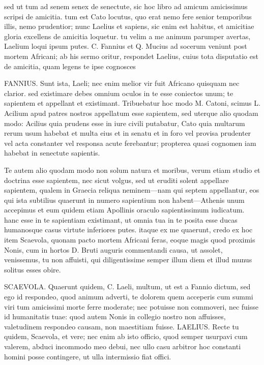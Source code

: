  sed ut tum ad senem senex de senectute, sic hoc libro ad amicum amicissimus scripsi de amicitia. tum est Cato locutus, quo erat nemo fere senior temporibus illis, nemo prudentior; nunc Laelius et sapiens, sic enim est habitus, et amicitiae gloria excellens de amicitia loquetur. tu velim a me animum parumper avertas, Laelium loqui ipsum putes. C. Fannius et Q. Mucius ad socerum veniunt post mortem Africani; ab his sermo oritur, respondet Laelius, cuius tota disputatio est de amicitia, quam legens te ipse cognosces

 FANNIUS. Sunt ista, Laeli; nec enim melior vir fuit Africano quisquam nec clarior. sed existimare debes omnium oculos in te esse coniectos unum; te sapientem et appellant et existimant. Tribuebatur hoc modo M. Catoni, scimus L. Acilium apud patres nostros appellatum esse sapientem, sed uterque alio quodam modo: Acilius quia prudens esse in iure civili putabatur, Cato quia multarum rerum usum habebat et multa eius et in senatu et in foro vel provisa prudenter vel acta constanter vel responsa acute ferebantur; propterea quasi cognomen iam habebat in senectute sapientis.

 Te autem alio quodam modo non solum natura et moribus, verum etiam studio et doctrina esse sapientem, nec sicut volgus, sed ut eruditi solent appellare sapientem, qualem in Graecia reliqua neminem—nam qui septem appellantur, eos qui ista subtilius quaerunt in numero sapientium non habent—Athenis unum accepimus et eum quidem etiam Apollinis oraculo sapientissimum iudicatum. hanc esse in te sapientiam existimant, ut omnia tua in te posita esse ducas humanosque casus virtute inferiores putes. itaque ex me quaerunt, credo ex hoc item Scaevola, quonam pacto mortem Africani feras, eoque magis quod proximis Nonis, cum in hortos D. Bruti auguris commentandi causa, ut assolet, venissemus, tu non affuisti, qui diligentissime semper illum diem et illud munus solitus esses obire.

 SCAEVOLA. Quaerunt quidem, C. Laeli, multum, ut est a Fannio dictum, sed ego id respondeo, quod animum adverti, te dolorem quem acceperis cum summi viri tum amicissimi morte ferre moderate; nec potuisse non commoveri, nec fuisse id humanitatis tuae: quod autem Nonis in collegio nostro non affuisses, valetudinem respondeo causam, non maestitiam fuisse. LAELIUS. Recte tu quidem, Scaevola, et vere; nec enim ab isto officio, quod semper usurpavi cum valerem, abduci incommodo meo debui, nec ullo casu arbitror hoc constanti homini posse contingere, ut ulla intermissio fiat offici.

